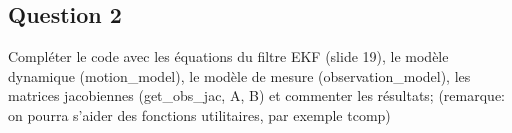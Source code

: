 \documentclass[../CSC_5RO12_TA_TP2.tex]{subfiles}
\begin{document}
\subsection{Question 2}

Compléter le code avec les équations du filtre EKF (slide 19), le modèle dynamique (motion\_model), le modèle de mesure (observation\_model), les matrices jacobiennes (get\_obs\_jac, A, B) et commenter les résultats; (remarque: on pourra s'aider des fonctions utilitaires, par exemple tcomp)
\end{document}
